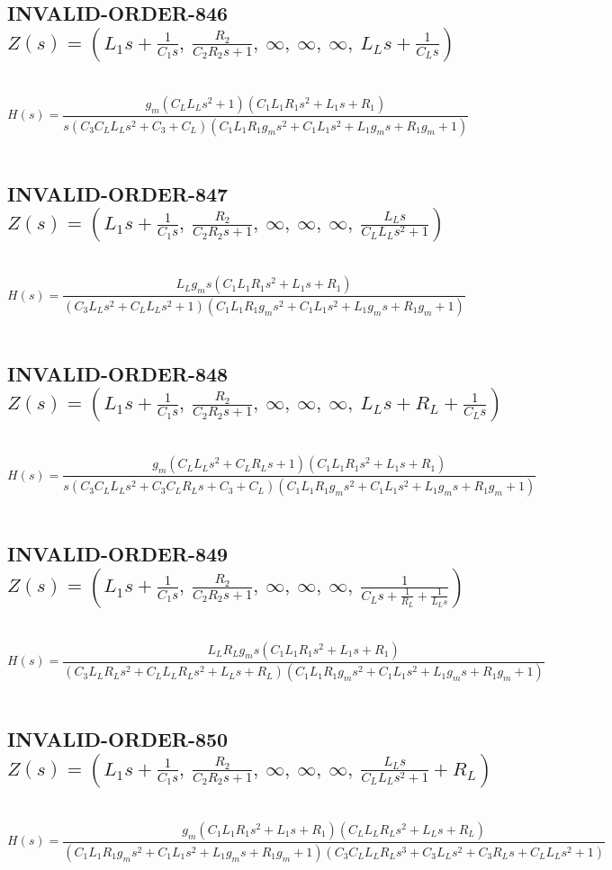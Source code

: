\documentclass{article}
\begin{document}
\subsection{INVALID-ORDER-846 $Z(s) = \left( L_{1} s + \frac{1}{C_{1} s}, \  \frac{R_{2}}{C_{2} R_{2} s + 1}, \  \infty, \  \infty, \  \infty, \  L_{L} s + \frac{1}{C_{L} s}\right)$ } \ 
\textbf{\[H(s) = \frac{g_{m} \left(C_{L} L_{L} s^{2} + 1\right) \left(C_{1} L_{1} R_{1} s^{2} + L_{1} s + R_{1}\right)}{s \left(C_{3} C_{L} L_{L} s^{2} + C_{3} + C_{L}\right) \left(C_{1} L_{1} R_{1} g_{m} s^{2} + C_{1} L_{1} s^{2} + L_{1} g_{m} s + R_{1} g_{m} + 1\right)}\] } \ 
\subsection{INVALID-ORDER-847 $Z(s) = \left( L_{1} s + \frac{1}{C_{1} s}, \  \frac{R_{2}}{C_{2} R_{2} s + 1}, \  \infty, \  \infty, \  \infty, \  \frac{L_{L} s}{C_{L} L_{L} s^{2} + 1}\right)$ } \ 
\textbf{\[H(s) = \frac{L_{L} g_{m} s \left(C_{1} L_{1} R_{1} s^{2} + L_{1} s + R_{1}\right)}{\left(C_{3} L_{L} s^{2} + C_{L} L_{L} s^{2} + 1\right) \left(C_{1} L_{1} R_{1} g_{m} s^{2} + C_{1} L_{1} s^{2} + L_{1} g_{m} s + R_{1} g_{m} + 1\right)}\] } \ 
\subsection{INVALID-ORDER-848 $Z(s) = \left( L_{1} s + \frac{1}{C_{1} s}, \  \frac{R_{2}}{C_{2} R_{2} s + 1}, \  \infty, \  \infty, \  \infty, \  L_{L} s + R_{L} + \frac{1}{C_{L} s}\right)$ } \ 
\textbf{\[H(s) = \frac{g_{m} \left(C_{L} L_{L} s^{2} + C_{L} R_{L} s + 1\right) \left(C_{1} L_{1} R_{1} s^{2} + L_{1} s + R_{1}\right)}{s \left(C_{3} C_{L} L_{L} s^{2} + C_{3} C_{L} R_{L} s + C_{3} + C_{L}\right) \left(C_{1} L_{1} R_{1} g_{m} s^{2} + C_{1} L_{1} s^{2} + L_{1} g_{m} s + R_{1} g_{m} + 1\right)}\] } \ 
\subsection{INVALID-ORDER-849 $Z(s) = \left( L_{1} s + \frac{1}{C_{1} s}, \  \frac{R_{2}}{C_{2} R_{2} s + 1}, \  \infty, \  \infty, \  \infty, \  \frac{1}{C_{L} s + \frac{1}{R_{L}} + \frac{1}{L_{L} s}}\right)$ } \ 
\textbf{\[H(s) = \frac{L_{L} R_{L} g_{m} s \left(C_{1} L_{1} R_{1} s^{2} + L_{1} s + R_{1}\right)}{\left(C_{3} L_{L} R_{L} s^{2} + C_{L} L_{L} R_{L} s^{2} + L_{L} s + R_{L}\right) \left(C_{1} L_{1} R_{1} g_{m} s^{2} + C_{1} L_{1} s^{2} + L_{1} g_{m} s + R_{1} g_{m} + 1\right)}\] } \ 
\subsection{INVALID-ORDER-850 $Z(s) = \left( L_{1} s + \frac{1}{C_{1} s}, \  \frac{R_{2}}{C_{2} R_{2} s + 1}, \  \infty, \  \infty, \  \infty, \  \frac{L_{L} s}{C_{L} L_{L} s^{2} + 1} + R_{L}\right)$ } \ 
\textbf{\[H(s) = \frac{g_{m} \left(C_{1} L_{1} R_{1} s^{2} + L_{1} s + R_{1}\right) \left(C_{L} L_{L} R_{L} s^{2} + L_{L} s + R_{L}\right)}{\left(C_{1} L_{1} R_{1} g_{m} s^{2} + C_{1} L_{1} s^{2} + L_{1} g_{m} s + R_{1} g_{m} + 1\right) \left(C_{3} C_{L} L_{L} R_{L} s^{3} + C_{3} L_{L} s^{2} + C_{3} R_{L} s + C_{L} L_{L} s^{2} + 1\right)}\] } \ 
\end{document}
